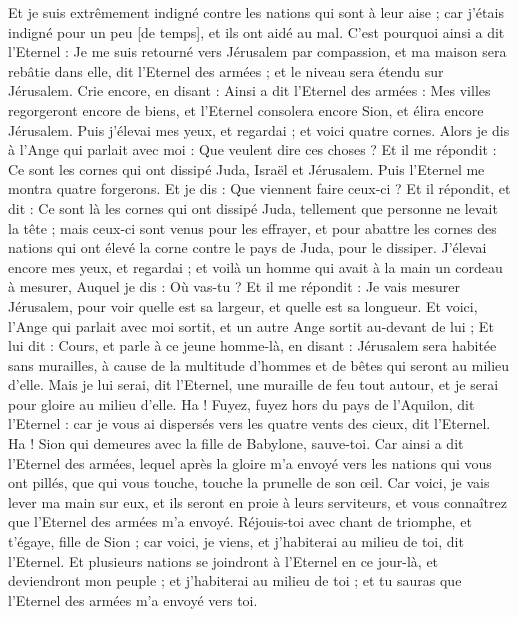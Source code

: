 \begin{multicols}{2}
Et je suis extrêmement indigné contre les nations qui sont à leur aise ; car j'étais indigné pour un peu [de temps], et ils ont aidé au mal.
C'est pourquoi ainsi a dit l'Eternel : Je me suis retourné vers Jérusalem par compassion, et ma maison sera rebâtie dans elle, dit l'Eternel des armées ; et le niveau sera étendu sur Jérusalem.
Crie encore, en disant : Ainsi a dit l'Eternel des armées : Mes villes regorgeront encore de biens, et l'Eternel consolera encore Sion, et élira encore Jérusalem.
Puis j'élevai mes yeux, et regardai ; et voici quatre cornes.
Alors je dis à l'Ange qui parlait avec moi : Que veulent dire ces choses ? Et il me répondit : Ce sont les cornes qui ont dissipé Juda, Israël et Jérusalem.
Puis l'Eternel me montra quatre forgerons.
Et je dis : Que viennent faire ceux-ci ? Et il répondit, et dit : Ce sont là les cornes qui ont dissipé Juda, tellement que personne ne levait la tête ; mais ceux-ci sont venus pour les effrayer, et pour abattre les cornes des nations qui ont élevé la corne contre le pays de Juda, pour le dissiper.
\VerseOne{}J'élevai encore mes yeux, et regardai ; et voilà un homme qui avait à la main un cordeau à mesurer,
Auquel je dis : Où vas-tu ? Et il me répondit : Je vais mesurer Jérusalem, pour voir quelle est sa largeur, et quelle est sa longueur.
Et voici, l'Ange qui parlait avec moi sortit, et un autre Ange sortit au-devant de lui ;
Et lui dit : Cours, et parle à ce jeune homme-là, en disant : Jérusalem sera habitée sans murailles, à cause de la multitude d'hommes et de bêtes qui seront au milieu d'elle.
Mais je lui serai, dit l'Eternel, une muraille de feu tout autour, et je serai pour gloire au milieu d'elle.
Ha ! Fuyez, fuyez hors du pays de l'Aquilon, dit l'Eternel : car je vous ai dispersés vers les quatre vents des cieux, dit l'Eternel.
Ha ! Sion qui demeures avec la fille de Babylone, sauve-toi.
Car ainsi a dit l'Eternel des armées, lequel après la gloire m'a envoyé vers les nations qui vous ont pillés, que qui vous touche, touche la prunelle de son œil.
Car voici, je vais lever ma main sur eux, et ils seront en proie à leurs serviteurs, et vous connaîtrez que l'Eternel des armées m'a envoyé.
Réjouis-toi avec chant de triomphe, et t'égaye, fille de Sion ; car voici, je viens, et j'habiterai au milieu de toi, dit l'Eternel.
Et plusieurs nations se joindront à l’Eternel en ce jour-là, et deviendront mon peuple ; et j'habiterai au milieu de toi ; et tu sauras que l'Eternel des armées m'a envoyé vers toi.

\end{multicols}
